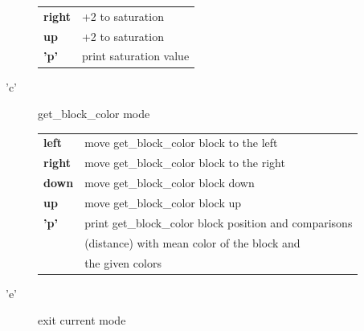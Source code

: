\begin{description}
\begin{tabular}{ll}
                {\bf right} & +2 to saturation \\
                {\bf up   } & +2 to saturation \\
                {\bf 'p'  } & print saturation value \\
            \end{tabular}
        \item['c'] get\_block\_color mode \\
            \begin{tabular}{ll} 
                {\bf left } & move get\_block\_color block to the left  \\
                {\bf right} & move get\_block\_color block to the right \\
                {\bf down } & move get\_block\_color block down \\
                {\bf up   } & move get\_block\_color block up \\
                {\bf 'p'  } & print get\_block\_color block position and 
                              comparisons \\
                            & (distance) with mean color of 
                              the block and \\
                            & the given colors \\
            \end{tabular}
        \item['e'] exit current mode
    \end{description}
